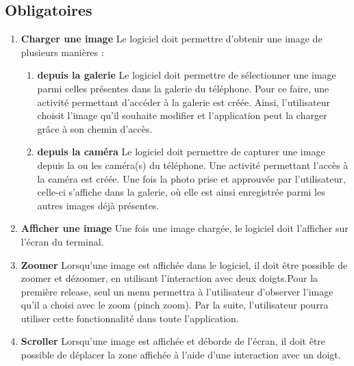 \documentclass{article}
\begin{document}
\subsection{Obligatoires}
\label{fonctionnelsObligatoires}
\begin{enumerate}
\item {\bf Charger une image} Le logiciel doit permettre d'obtenir une image de plusieurs manières :
  \begin{enumerate}
  \item {\bf depuis la galerie} Le logiciel doit permettre de sélectionner une image parmi celles présentes dans la galerie du téléphone. Pour ce faire, une activité permettant d'accéder à la galerie est créée. Ainsi, l'utilisateur choisit l'image qu'il souhaite modifier et l'application peut la charger grâce à son chemin d'accès.
  \item {\bf depuis la caméra} Le logiciel doit permettre de capturer une image depuis la ou les caméra(s) du téléphone. Une activité permettant l'accès à la caméra est créée. Une fois la photo prise et approuvée par l'utilisateur, celle-ci s'affiche dans la galerie, où elle est ainsi enregistrée parmi les autres images déjà présentes.
  \end{enumerate}
\item {\bf Afficher une image} Une fois une image chargée, le logiciel doit l'afficher sur l'écran du terminal.
\item {\bf Zoomer} Lorsqu'une image est affichée dans le logiciel, il doit être possible de zoomer et dézoomer, en utilisant l'interaction avec deux doigts.Pour la première release, seul un menu permettra à l'utilisateur d'observer l'image qu'il a choisi avec le zoom (pinch zoom). Par la suite, l'utilisateur pourra utiliser cette fonctionnalité dans toute l'application.
\item {\bf Scroller} Lorsqu'une image est affichée et déborde de l'écran, il doit être possible de déplacer la zone affichée à l'aide d'une interaction avec un doigt. 


\end{enumerate}
\end{document}
